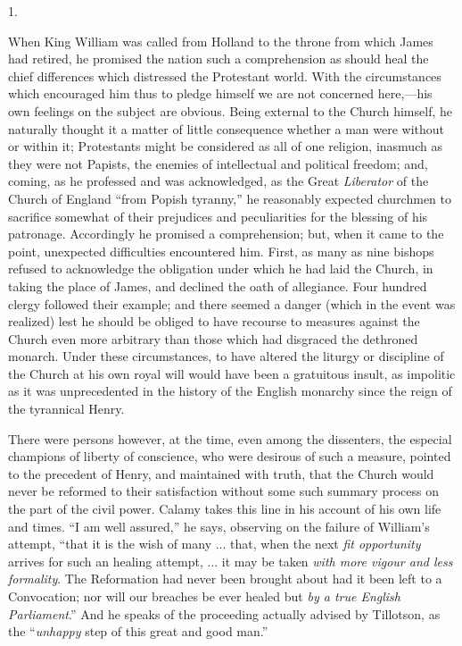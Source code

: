 1.

When King William was called
from Holland to the throne from which James had retired, he promised
the nation such a comprehension as should heal the chief differences
which distressed the Protestant world. With the circumstances which
encouraged him thus to pledge himself we are not concerned here,—his
own feelings on the subject are obvious. Being external to the Church
himself, he naturally thought it a matter of little consequence
whether a man were without or within it; Protestants might be
considered as all of one religion, inasmuch as they were not Papists,
the enemies of intellectual and political freedom; and, coming, as he
professed and was acknowledged, as the Great \emph{Liberator} of the
Church of England ``from Popish tyranny,'' he reasonably expected
churchmen to sacrifice somewhat of their prejudices and peculiarities
for the blessing of his patronage. Accordingly he promised a
comprehension; but, when it came to the point, unexpected difficulties
encountered him. First, as many as nine bishops refused to acknowledge
the obligation under which he had laid the Church, in taking the place
of James, and declined the oath of allegiance. Four hundred clergy
followed their example; and there seemed a danger (which in the event
was realized) lest he should be obliged to have recourse to measures
against the Church even more arbitrary than those which had disgraced
the dethroned monarch. Under these circumstances, to have altered the
liturgy or discipline of the Church at his own royal will would have
been a gratuitous insult, as impolitic as it was unprecedented in the
history of the English monarchy since the reign of the tyrannical
Henry.

There were persons however, at
the time, even among the dissenters, the especial champions of
liberty of conscience, who were desirous of such a measure, pointed to
the precedent of Henry, and maintained with truth, that the Church
would never be reformed to their satisfaction without some such
summary process on the part of the civil power. Calamy takes this line
in his account of his own life and times. ``I am well assured,'' he
says, observing on the failure of William's attempt, ``that it is the
wish of many ... that, when the next \emph{fit opportunity} arrives
for such an healing attempt, ... it may be taken \emph{with more vigour
and less formality}. The Reformation had never been brought about
had it been left to a Convocation; nor will our breaches be ever
healed but \emph{by a true English Parliament}.'' And he speaks of the
proceeding actually advised by Tillotson, as the ``\emph{unhappy} step
of this great and good man.''

